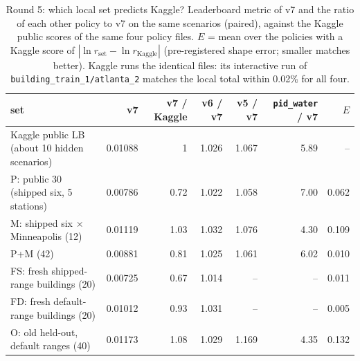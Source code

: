 \begin{table}[!htbp]
\caption{Round 5: which local set predicts Kaggle? Leaderboard metric of v7 and the ratio of each other policy to v7 on the same scenarios (paired), against the Kaggle public scores of the same four policy files. $E$ = mean over the policies with a Kaggle score of $|\ln r_{\text{set}} - \ln r_{\text{Kaggle}}|$ (pre-registered shape error; smaller matches better). Kaggle runs the identical files: its interactive run of \texttt{building\_train\_1/atlanta\_2} matches the local total within 0.02\% for all four.}
\label{tab:kaggle_r5}
\centering\scriptsize
\setlength{\tabcolsep}{3.5pt}
\begin{tabular}{lrrrrrr}
\toprule
set & v7 & v7 / Kaggle & v6 / v7 & v5 / v7 & \texttt{pid\_water} / v7 & $E$ \\
\midrule
Kaggle public LB (about 10 hidden scenarios) & 0.01088 & 1 & 1.026 & 1.067 & 5.89 & -- \\
\midrule
P: public 30 (shipped six, 5 stations) & 0.00786 & 0.72 & 1.022 & 1.058 & 7.00 & 0.062 \\
M: shipped six $\times$ Minneapolis (12) & 0.01119 & 1.03 & 1.032 & 1.076 & 4.30 & 0.109 \\
P+M (42) & 0.00881 & 0.81 & 1.025 & 1.061 & 6.02 & 0.010 \\
FS: fresh shipped-range buildings (20) & 0.00725 & 0.67 & 1.014 & -- & -- & 0.011 \\
FD: fresh default-range buildings (20) & 0.01012 & 0.93 & 1.031 & -- & -- & 0.005 \\
O: old held-out, default ranges (40) & 0.01173 & 1.08 & 1.029 & 1.169 & 4.35 & 0.132 \\
\bottomrule
\end{tabular}
\end{table}
